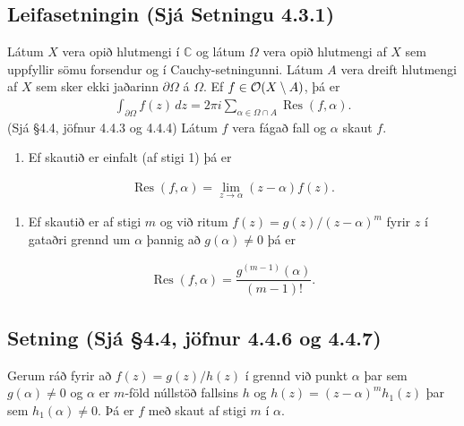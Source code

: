 \documentclass[a4paper,10pt,icelandic]{sphinxmanual}
\begin{document}
\subsection{Leifasetningin (Sjá Setningu 4.3.1)}
\label{\detokenize{Kafli04:leifasetningin-sja-setningu-4-3-1}}
Látum \(X\) vera opið hlutmengi í \({\mathbb{C}}\) og látum \(\Omega\) vera opið hlutmengi af \(X\) sem uppfyllir sömu forsendur og í Cauchy-setningunni. Látum \(A\) vera dreift hlutmengi af \(X\) sem sker ekki jaðarinn \(\partial\Omega\) á \(\Omega\). Ef \(f\in {\cal O}(X\setminus A)\), þá er
\begin{equation*}
\begin{split}\int_{\partial\Omega}f(z)\, dz = 2\pi i \sum_{\alpha\in \Omega\cap A}
\operatorname{Res}(f,\alpha).\end{split}
\end{equation*}
(Sjá \S{}4.4, jöfnur 4.4.3 og 4.4.4) Látum \(f\) vera fágað fall og \(\alpha\) skaut \(f\).
\begin{enumerate}
%
\item {} 
Ef skautið er einfalt (af stigi 1) þá er

\end{enumerate}
\begin{equation*}
\begin{split}\operatorname{Res}(f,\alpha)=\lim_{z\to \alpha}(z-\alpha)f(z).\end{split}
\end{equation*}\begin{enumerate}
%
\setcounter{enumi}{1}
\item {} 
Ef skautið er af stigi \(m\) og við ritum \(f(z)=g(z)/(z-\alpha)^m\) fyrir \(z\) í gataðri grennd um \(\alpha\) þannig að \(g(\alpha)\neq 0\) þá er

\end{enumerate}
\begin{equation*}
\begin{split}\operatorname{Res}(f,\alpha)=\dfrac{g^{(m-1)}(\alpha)}{(m-1)!}.\end{split}
\end{equation*}

\subsection{Setning (Sjá \S{}4.4, jöfnur 4.4.6 og 4.4.7)}
\label{\detokenize{Kafli04:setning-sja-4-4-jofnur-4-4-6-og-4-4-7}}
Gerum ráð fyrir að \(f(z)=g(z)/h(z)\) í grennd við punkt \(\alpha\) þar sem \(g(\alpha)\neq 0\) og \(\alpha\) er \(m\)-föld núllstöð fallsins \(h\) og \(h(z)=(z-\alpha)^mh_1(z)\) þar sem \(h_1(\alpha)\neq 0\). Þá er \(f\) með skaut af stigi \(m\) í \(\alpha\).
\end{document}

